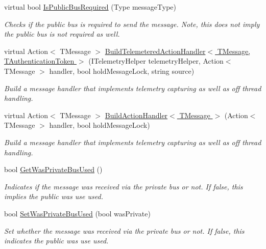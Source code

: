 \begin{DoxyCompactItemize}
virtual bool \hyperlink{classCqrs_1_1Bus_1_1BusHelper_ac5d953a97736424eff59b6033351be46_ac5d953a97736424eff59b6033351be46}{Is\+Public\+Bus\+Required} (Type message\+Type)
\begin{DoxyCompactList}\small\item\em Checks if the public bus is required to send the message. Note, this does not imply the public bus is not required as well. \end{DoxyCompactList}\item 
virtual Action$<$ T\+Message $>$ \hyperlink{classCqrs_1_1Bus_1_1BusHelper_a7edd5b2ac0d46ce225e592f857f6d525_a7edd5b2ac0d46ce225e592f857f6d525}{Build\+Telemetered\+Action\+Handler$<$ T\+Message, T\+Authentication\+Token $>$} (I\+Telemetry\+Helper telemetry\+Helper, Action$<$ T\+Message $>$ handler, bool hold\+Message\+Lock, string source)
\begin{DoxyCompactList}\small\item\em Build a message handler that implements telemetry capturing as well as off thread handling. \end{DoxyCompactList}\item 
virtual Action$<$ T\+Message $>$ \hyperlink{classCqrs_1_1Bus_1_1BusHelper_a6dc1f5166b7bcd13aa7a0d5e25ded295_a6dc1f5166b7bcd13aa7a0d5e25ded295}{Build\+Action\+Handler$<$ T\+Message $>$} (Action$<$ T\+Message $>$ handler, bool hold\+Message\+Lock)
\begin{DoxyCompactList}\small\item\em Build a message handler that implements telemetry capturing as well as off thread handling. \end{DoxyCompactList}\item 
bool \hyperlink{classCqrs_1_1Bus_1_1BusHelper_a68714a43256976db7d780b126ca3f8bd_a68714a43256976db7d780b126ca3f8bd}{Get\+Was\+Private\+Bus\+Used} ()
\begin{DoxyCompactList}\small\item\em Indicates if the message was received via the private bus or not. If false, this implies the public was use used. \end{DoxyCompactList}\item 
bool \hyperlink{classCqrs_1_1Bus_1_1BusHelper_ae243200364c620a2719b7be62d74eb7e_ae243200364c620a2719b7be62d74eb7e}{Set\+Was\+Private\+Bus\+Used} (bool was\+Private)
\begin{DoxyCompactList}\small\item\em Set whether the message was received via the private bus or not. If false, this indicates the public was use used. \end{DoxyCompactList}\end{DoxyCompactItemize}
